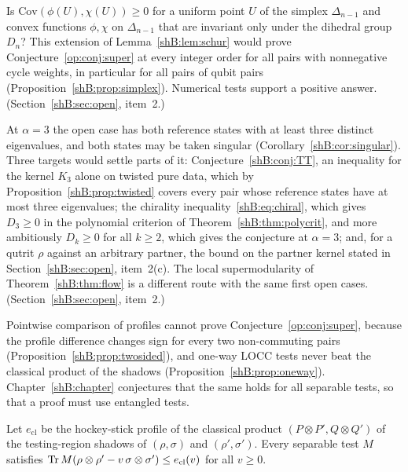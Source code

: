 \begin{question}\label{op:q:dihedral}
Is $\mathrm{Cov}(\phi(U),\chi(U))\ge0$ for a uniform point $U$ of the simplex $\Delta_{n-1}$ and convex functions $\phi,\chi$ on $\Delta_{n-1}$ that are invariant only under the dihedral group $D_n$? This extension of Lemma~\ref{shB:lem:schur} would prove Conjecture~\ref{op:conj:super} at every integer order for all pairs with nonnegative cycle weights, in particular for all pairs of qubit pairs (Proposition~\ref{shB:prop:simplex}). Numerical tests support a positive answer. (Section~\ref{shB:sec:open}, item~2.)
\end{question}

\begin{problem}\label{op:prob:order three}
At $\alpha=3$ the open case has both reference states with at least three distinct eigenvalues, and both states may be taken singular (Corollary~\ref{shB:cor:singular}). Three targets would settle parts of it: Conjecture~\ref{shB:conj:TT}, an inequality for the kernel $K_3$ alone on twisted pure data, which by Proposition~\ref{shB:prop:twisted} covers every pair whose reference states have at most three eigenvalues; the chirality inequality~\eqref{shB:eq:chiral}, which gives $D_3\ge0$ in the polynomial criterion of Theorem~\ref{shB:thm:polycrit}, and more ambitiously $D_k\ge0$ for all $k\ge2$, which gives the conjecture at $\alpha=3$; and, for a qutrit $\rho$ against an arbitrary partner, the bound on the partner kernel stated in Section~\ref{shB:sec:open}, item~2(c). The local supermodularity of Theorem~\ref{shB:thm:flow} is a different route with the same first open cases. (Section~\ref{shB:sec:open}, item~2.)
\end{problem}

Pointwise comparison of profiles cannot prove Conjecture~\ref{op:conj:super}, because the profile difference changes sign for every two non-commuting pairs (Proposition~\ref{shB:prop:twosided}), and one-way LOCC tests never beat the classical product of the shadows (Proposition~\ref{shB:prop:oneway}). Chapter~\ref{shB:chapter} conjectures that the same holds for all separable tests, so that a proof must use entangled tests.

\begin{conjecture}\label{op:conj:sep}
Let $e_{\mathrm{cl}}$ be the hockey-stick profile of the classical product $(P\otimes P',Q\otimes Q')$ of the testing-region shadows of $(\rho,\sigma)$ and $(\rho',\sigma')$. Every separable test $M$ satisfies $\operatorname{Tr} M(\rho\otimes\rho'-v\,\sigma\otimes\sigma')\le e_{\mathrm{cl}}(v)$ for all $v\ge0$.
\end{conjecture}

